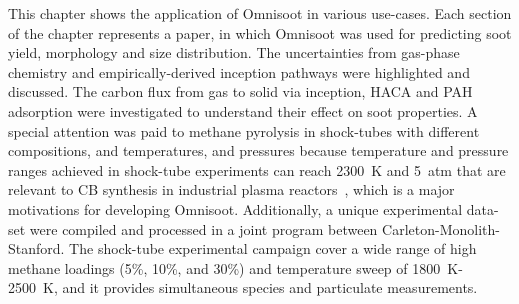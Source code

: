 This chapter shows the application of Omnisoot in various use-cases. Each section of the chapter represents a paper, in which Omnisoot was used for predicting soot yield, morphology and size distribution. The uncertainties from gas-phase chemistry and empirically-derived inception pathways were highlighted and discussed. The carbon flux from gas to solid via inception, HACA and PAH adsorption were investigated to understand their effect on soot properties. A special attention was paid to methane pyrolysis in shock-tubes with different compositions, and temperatures, and pressures because temperature and pressure ranges achieved in shock-tube experiments can reach 2300~K and 5~atm that are relevant to CB synthesis in industrial plasma reactors~\citep{fulcheri2023energy}, which is a major motivations for developing Omnisoot. Additionally, a unique experimental data-set were compiled and processed in a joint program between Carleton-Monolith-Stanford. The shock-tube experimental campaign cover a wide range of high methane loadings (5\%, 10\%, and 30\%) and temperature sweep of 1800~K-2500~K, and it provides simultaneous species and particulate measurements. 




